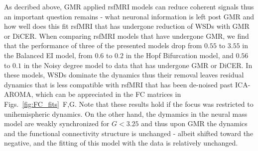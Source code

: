 \documentclass[oneside]{zHenriquesLab-StyleBioRxiv}
\begin{document}
As decribed above, GMR applied rsfMRI models can reduce coherent signals thus an important question remains - what neuronal information is left post GMR and how well does this fit rsfMRI that has undergone reduction of WSDs with GMR or DiCER. When comparing rsfMRI models that have undergone GMR, we find that the performance of three of the presented models drop from $0.55$ to $3.55$ in the Balanced EI model, from $0.6$ to $0.2$ in the Hopf Bifurcation model, and $0.56$ to $0.1$ in the Noisy degree model to data that has undergone GMR or DiCER. In these models, WSDs dominate the dynamics thus their removal leaves residual dynamics that is less compatible with rsfMRI that has been de-noised past ICA-AROMA, which can be appreciated in the FC matrices in Figs.~\ref{fig:FC_fits}~F,G. Note that these results hold if the focus was restricted to unihemispheric dynamics. On the other hand, the dymamics in the neural mass model are weakly synchronized for $G<3.25$ and thus upon GMR the dynamics and the functional connectivity structure is unchanged - albeit shifted toward the negative, and the fitting of this model with the data is relatively unchanged. 
\end{document}
